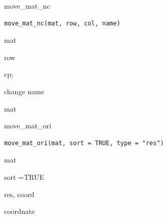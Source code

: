 \documentclass[a4paper]{book}
\begin{document}
%
\begin{Description}
move\_mat\_nc
\end{Description}
%
\begin{Usage}
\begin{verbatim}
move_mat_nc(mat, row, col, name)
\end{verbatim}
\end{Usage}
%
\begin{Arguments}
\begin{ldescription}
\item[\code{mat}] mat

\item[\code{row}] row

\item[\code{col}] cp;

\item[\code{name}] change name
\end{ldescription}
\end{Arguments}
%
\begin{Value}
mat
\end{Value}
%
\begin{Description}
move\_mat\_ori
\end{Description}
%
\begin{Usage}
\begin{verbatim}
move_mat_ori(mat, sort = TRUE, type = "res")
\end{verbatim}
\end{Usage}
%
\begin{Arguments}
\begin{ldescription}
\item[\code{mat}] mat

\item[\code{sort}] sort =TRUE

\item[\code{type}] res, coord
\end{ldescription}
\end{Arguments}
%
\begin{Value}
coordnate
\end{Value}
%
\end{document}
